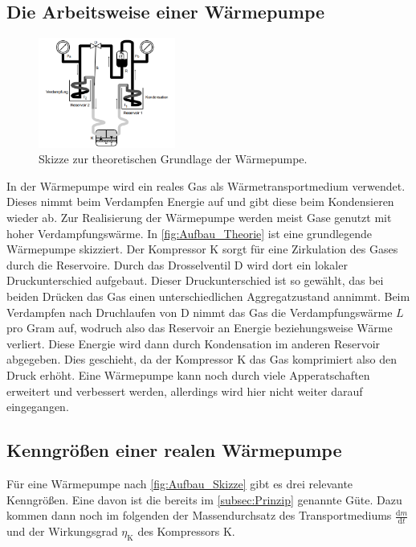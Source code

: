 \subsection{Die Arbeitsweise einer Wärmepumpe}
\label{Arbeitsweise}
\begin{figure}
    \centering
    \includegraphics[width=0.4\textwidth]{content/Ausfbau_Skizze_Theorie.png}
	\caption{Skizze zur theoretischen Grundlage der Wärmepumpe.}
	\label{fig:Aufbau_Theorie}
\end{figure}


In der Wärmepumpe wird ein reales Gas als Wärmetransportmedium verwendet. Dieses nimmt beim Verdampfen Energie auf und gibt diese beim Kondensieren wieder ab. Zur Realisierung der 
Wärmepumpe werden meist Gase genutzt mit hoher Verdampfungswärme. In \autoref{fig:Aufbau_Theorie} ist eine grundlegende Wärmepumpe skizziert. Der Kompressor K sorgt für eine Zirkulation 
des Gases durch die Reservoire. Durch das Drosselventil D wird dort ein lokaler Druckunterschied aufgebaut. Dieser Druckunterschied ist so gewählt, das bei beiden Drücken das Gas
einen unterschiedlichen Aggregatzustand annimmt. Beim Verdampfen nach Druchlaufen von D nimmt das Gas die Verdampfungswärme $L$ pro Gram auf, wodruch also das Reservoir an Energie 
beziehungsweise Wärme verliert. Diese Energie wird dann durch Kondensation im anderen Reservoir abgegeben. Dies geschieht, da der Kompressor K das Gas komprimiert also den Druck erhöht.
Eine Wärmepumpe kann noch durch viele Apperatschaften erweitert und verbessert werden, allerdings wird hier nicht weiter darauf eingegangen. 

\subsection{Kenngrößen einer realen Wärmepumpe}


Für eine Wärmepumpe nach \autoref{fig:Aufbau_Skizze} gibt es drei relevante Kenngrößen. Eine davon ist die bereits im \autoref{subsec:Prinzip} genannte Güte. Dazu kommen dann noch im
folgenden der Massendurchsatz des Transportmediums $\frac{\text{d}m}{\text{d}t}$ und der Wirkungsgrad $\eta_{\text{K}}$ des Kompressors K. 


